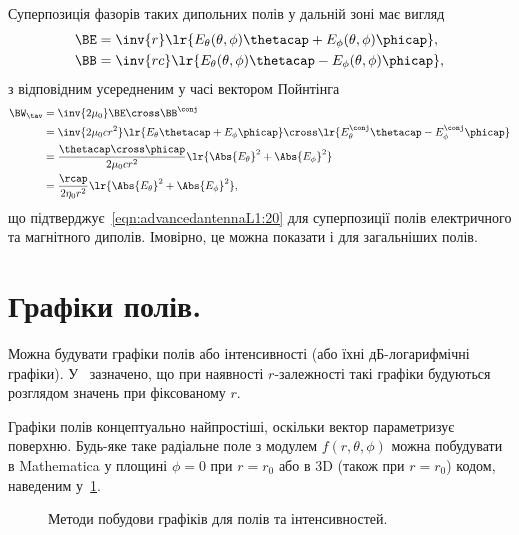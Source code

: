 Суперпозиція фазорів таких дипольних полів у дальній зоні має вигляд
\begin{equation}\label{eqn:chapter2Notes:800}
\begin{aligned}
\BE &= \inv{r} \lr{E_\theta(\theta, \phi) \thetacap + E_\phi(\theta, \phi) \phicap}, \\
\BB &= \inv{r c} \lr{E_\theta(\theta, \phi) \thetacap - E_\phi(\theta, \phi) \phicap},
\end{aligned}
\end{equation}
з відповідним усередненим у часі вектором Пойнтінга
\begin{equation}\label{eqn:chapter2Notes:820}
\begin{aligned}
\BW_\tav
&= \inv{2 \mu_0} \BE \cross \BB^\conj
\\ &=
\inv{2 \mu_0 c r^2}
\lr{E_\theta \thetacap + E_\phi \phicap} \cross
\lr{E_\theta^\conj \thetacap - E_\phi^\conj \phicap}
\\ &=
\frac{\thetacap \cross \phicap}{2 \mu_0 c r^2}
\lr{\Abs{E_\theta}^2 + \Abs{E_\phi}^2}
\\ &=
\frac{\rcap}{2 \eta_0 r^2}
\lr{\Abs{E_\theta}^2 + \Abs{E_\phi}^2},
\end{aligned}
\end{equation}
що підтверджує~\cref{eqn:advancedantennaL1:20} для суперпозиції полів електричного та магнітного диполів. Імовірно, це можна показати і для загальніших полів.

\section{Графіки полів.}
Можна будувати графіки полів або інтенсивності (або їхні \si{дБ}-логарифмічні графіки).
У~\citep{griffiths1999introduction} зазначено, що при наявності \(r\)-залежності такі графіки будуються розглядом значень при фіксованому \(r\).

Графіки полів концептуально найпростіші, оскільки вектор параметризує поверхню. Будь-яке таке радіальне поле з модулем \(f(r, \theta, \phi)\) можна побудувати в Mathematica у площині \(\phi = 0\) при \(r = r_0\) або в 3D (також при \(r = r_0\)) кодом, наведеним у~\cref{eqn:chapter2Notes:600}.

\begin{figure}
\caption{Методи побудови графіків для полів та інтенсивностей.}\label{eqn:chapter2Notes:600}
\begin{shaded}
\end{shaded}
\end{figure}

